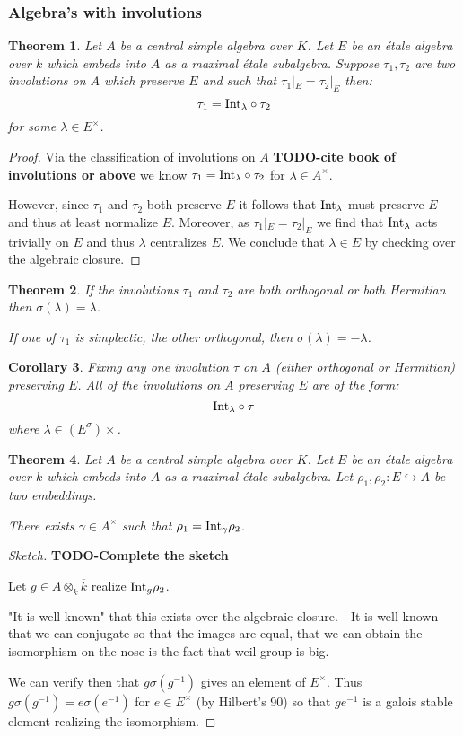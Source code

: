 \documentclass{article}
\theoremstyle{plain}
\newtheorem{theorem}{Theorem}[section]
\newtheorem{corollary}[theorem]{Corollary}
\theoremstyle{definition}
\numberwithin{equation}{section}
\newcommand{\TODO}[1]{\textbf{TODO-#1}}
\begin{document}
\subsubsection{Algebra's with involutions}

\begin{theorem}
Let $A$ be a central simple algebra over $K$.
Let $E$ be an \'etale algebra over $k$ which embeds into $A$ as a maximal \'etale subalgebra.
Suppose $\tau_1,\tau_2$ are two involutions on $A$ which preserve $E$ and such that $\tau_1|_E = \tau_2|_E$ then:
\[ \tau_1 = {\rm Int}_\lambda\circ\tau_2 \]
for some $\lambda \in E^\times$.
\end{theorem}
\begin{proof}
Via the classification of involutions on $A$
\TODO{cite book of involutions or above}
 we know $\tau_1 = {\rm Int}_\lambda\circ\tau_2$ for $\lambda \in A^\times$.

However, since $\tau_1$ and $\tau_2$ both preserve $E$ it follows that ${\rm Int}_\lambda$ must preserve $E$ and thus at least normalize $E$.
Moreover, as $\tau_1|_E = \tau_2|_E$ we find that ${\rm Int}_\lambda$ acts trivially on $E$ and thus $\lambda$ centralizes $E$. We conclude that $\lambda\in E$ by checking over the algebraic closure.
\end{proof}

\begin{theorem}
If the involutions $\tau_1$ and $\tau_2$ are both orthogonal or both Hermitian then $\sigma(\lambda) = \lambda$.

If one of $\tau_1$ is simplectic, the other orthogonal, then $\sigma(\lambda) = -\lambda$.
\end{theorem}

\begin{corollary}
Fixing any one involution $\tau$ on $A$ (either orthogonal or Hermitian) preserving $E$.
All of the involutions on $A$ preserving $E$ are of the form:
\[ {\rm Int}_\lambda\circ\tau \]
where $\lambda \in (E^\sigma)\times$.
\end{corollary}

\begin{theorem}
Let $A$ be a central simple algebra over $K$.
Let $E$ be an \'etale algebra over $k$ which embeds into $A$ as a maximal \'etale subalgebra.
Let $\rho_1,\rho_2 : E\hookrightarrow A$ be two embeddings.

There exists $\gamma \in A^\times$ such that $\rho_1 = {\rm Int}_\gamma\rho_2$.
\end{theorem}
\begin{proof}[Sketch]
\TODO{Complete the sketch}

Let $g\in A \otimes_k \overline{k}$ realize ${\rm Int}_g\rho_2$.

"It is well known" that this exists over the algebraic closure.
  - It is well known that we can conjugate so that the images are equal, that we can obtain the isomorphism on the nose is the fact that weil group is big.

We can verify then that $g\sigma(g^{-1})$ gives an element of $E^\times$.
Thus $g\sigma(g^{-1}) = e\sigma(e^{-1})$ for $e\in E^\times$ (by Hilbert's 90) so that $ge^{-1}$ is a galois stable element realizing the isomorphism.
\end{proof}
\end{document}
